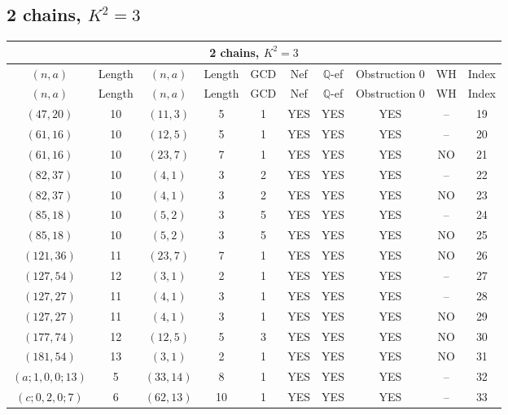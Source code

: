\subsection{2 chains, $K^2 = 3$}
\begin{longtable}{|c|c|c|c|c|c|c|c|c|c|}
\hline
\multicolumn{10}{|c|}{2 chains, $K^2 = 3$}\\
\hline
$(n,a)$ & Length & $(n,a)$ & Length & GCD & Nef & $\mathbb Q$-ef & Obstruction 0 & WH & Index\\
\hline
\endfirsthead

\hline
$(n,a)$ & Length & $(n,a)$ & Length & GCD & Nef & $\mathbb Q$-ef & Obstruction 0 & WH & Index\\
\hline
\endhead
\hline
\endfoot

$(47, 20)$ & 10 & $(11, 3)$ & 5 & 1 & YES & YES & YES & -- & 19\\
$(61, 16)$ & 10 & $(12, 5)$ & 5 & 1 & YES & YES & YES & -- & 20\\
$(61, 16)$ & 10 & $(23, 7)$ & 7 & 1 & YES & YES & YES & NO & 21\\
$(82, 37)$ & 10 & $(4, 1)$ & 3 & 2 & YES & YES & YES & -- & 22\\
$(82, 37)$ & 10 & $(4, 1)$ & 3 & 2 & YES & YES & YES & NO & 23\\
$(85, 18)$ & 10 & $(5, 2)$ & 3 & 5 & YES & YES & YES & -- & 24\\
$(85, 18)$ & 10 & $(5, 2)$ & 3 & 5 & YES & YES & YES & NO & 25\\
$(121, 36)$ & 11 & $(23, 7)$ & 7 & 1 & YES & YES & YES & NO & 26\\
$(127, 54)$ & 12 & $(3, 1)$ & 2 & 1 & YES & YES & YES & -- & 27\\
$(127, 27)$ & 11 & $(4, 1)$ & 3 & 1 & YES & YES & YES & -- & 28\\
$(127, 27)$ & 11 & $(4, 1)$ & 3 & 1 & YES & YES & YES & NO & 29\\
$(177, 74)$ & 12 & $(12, 5)$ & 5 & 3 & YES & YES & YES & NO & 30\\
$(181, 54)$ & 13 & $(3, 1)$ & 2 & 1 & YES & YES & YES & NO & 31\\
$(a; 1, 0, 0; 13)$ & 5 & $(33, 14)$ & 8 & 1 & YES & YES & YES & -- & 32\\
$(c; 0, 2, 0; 7)$ & 6 & $(62, 13)$ & 10 & 1 & YES & YES & YES & -- & 33
\end{longtable}
